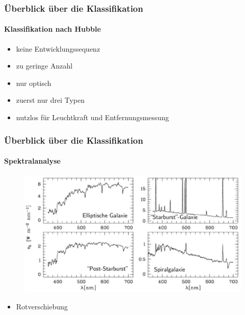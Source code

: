 



\begin{frame}
\frametitle{Überblick über die Klassifikation}
\framesubtitle{Klassifikation nach Hubble}

\begin{itemize}
\item keine Entwicklungssequenz
\item zu geringe Anzahl
\item nur optisch
\item zuerst nur drei Typen
\item nutzlos für Leuchtkraft und Entfernungsmessung
\end{itemize}

\end{frame}

\begin{frame}
\frametitle{Überblick über die Klassifikation}
\framesubtitle{Spektralanalyse}

\begin{figure}
\includegraphics[scale=0.4]{Galaxiespektren.jpg}
\end{figure}

\begin{itemize}
\item Rotverschiebung
\end{itemize}

\end{frame}


